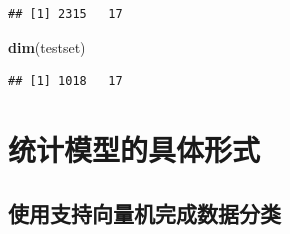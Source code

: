 \documentclass[
]{article}
\newenvironment{Shaded}{\begin{snugshade}}{\end{snugshade}}
\newcommand{\CommentTok}[1]{\textcolor[rgb]{0.56,0.35,0.01}{\textit{#1}}}
\newcommand{\DataTypeTok}[1]{\textcolor[rgb]{0.13,0.29,0.53}{#1}}
\newcommand{\DecValTok}[1]{\textcolor[rgb]{0.00,0.00,0.81}{#1}}
\newcommand{\FloatTok}[1]{\textcolor[rgb]{0.00,0.00,0.81}{#1}}
\newcommand{\KeywordTok}[1]{\textcolor[rgb]{0.13,0.29,0.53}{\textbf{#1}}}
\newcommand{\NormalTok}[1]{#1}
\newcommand{\OperatorTok}[1]{\textcolor[rgb]{0.81,0.36,0.00}{\textbf{#1}}}
\newcommand{\OtherTok}[1]{\textcolor[rgb]{0.56,0.35,0.01}{#1}}
\newcommand{\StringTok}[1]{\textcolor[rgb]{0.31,0.60,0.02}{#1}}
\begin{document}
\begin{Shaded}
\end{Shaded}

\begin{verbatim}
## [1] 2315   17
\end{verbatim}

\begin{Shaded}
\begin{Highlighting}[]
\KeywordTok{dim}\NormalTok{(testset)}
\end{Highlighting}
\end{Shaded}

\begin{verbatim}
## [1] 1018   17
\end{verbatim}

\hypertarget{ux7edfux8ba1ux6a21ux578bux7684ux5177ux4f53ux5f62ux5f0f}{%
\section{统计模型的具体形式}\label{ux7edfux8ba1ux6a21ux578bux7684ux5177ux4f53ux5f62ux5f0f}}

\hypertarget{ux4f7fux7528ux652fux6301ux5411ux91cfux673aux5b8cux6210ux6570ux636eux5206ux7c7b}{%
\subsection{使用支持向量机完成数据分类}\label{ux4f7fux7528ux652fux6301ux5411ux91cfux673aux5b8cux6210ux6570ux636eux5206ux7c7b}}
\end{document}
